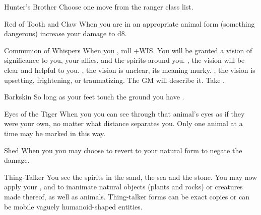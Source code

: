 \documentclass[8pt]{extarticle}
\begin{document}
\begin{multicols}{2}

\firstAdvances

\begin{amove}{Hunter’s Brother}
  Choose one move from the ranger class list.
\end{amove}

\begin{amove}{Red of Tooth and Claw}
  When you are in an appropriate animal form (something dangerous)
  increase your damage to d8.
\end{amove}

\begin{amove}{Communion of Whispers}
  When you , roll
  +WIS. You will be granted a vision of significance to you, your
  allies, and the spirits around you. \onSuccess, the vision will be
  clear and helpful to you. \onPartial, the vision is unclear, its
  meaning murky. \onMiss, the vision is upsetting, frightening, or
  traumatizing. The GM will describe it. Take .
\end{amove}

\begin{amove}{Barkskin}
  So long as your feet touch the ground you have .
\end{amove}

\begin{amove}{Eyes of the Tiger}
  When you  you
  can see through that animal’s eyes as if they were your own, no
  matter what distance separates you. Only one animal at a time may be
  marked in this way.
\end{amove}

\begin{amove}{Shed}
  When you  you may choose
  to revert to your natural form to negate the damage.
\end{amove}

\begin{amove}{Thing-Talker}
  You see the spirits in the sand, the sea and the stone. You may now
  apply your ,  and
   to inanimate natural objects (plants and
  rocks) or creatures made thereof, as well as animals. Thing-talker
  forms can be exact copies or can be mobile vaguely humanoid-shaped
  entities.
\end{amove}


\end{multicols}
\end{document}
